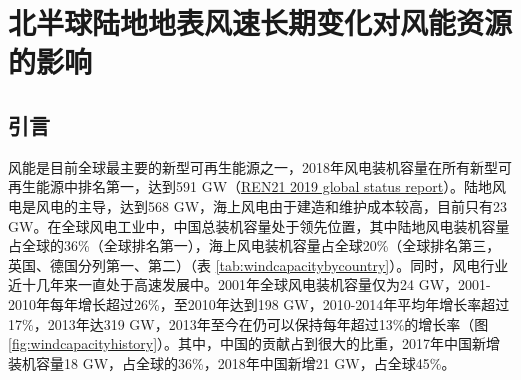 \chapter{北半球陆地地表风速长期变化对风能资源的影响}\label{chap:windenergychange}

\section{引言}

风能是目前全球最主要的新型可再生能源之一，2018年风电装机容量在所有新型可再生能源中排名第一，达到591 GW（\href{https://www.ren21.net/wp-content/uploads/2019/05/gsr_2019_full_report_en.pdf}{REN21 2019 global status report}）。陆地风电是风电的主导，达到568 GW，海上风电由于建造和维护成本较高，目前只有23 GW。在全球风电工业中，中国总装机容量处于领先位置，其中陆地风电装机容量占全球的36\%（全球排名第一），海上风电装机容量占全球20\%（全球排名第三，英国、德国分列第一、第二）（表 \ref{tab:windcapacitybycountry}）。同时，风电行业近十几年来一直处于高速发展中。2001年全球风电装机容量仅为24 GW，2001-2010年每年增长超过26\%，至2010年达到198 GW，2010-2014年平均年增长率超过17\%，2013年达319 GW，2013年至今在仍可以保持每年超过13\%的增长率（图 \ref{fig:windcapacityhistory}）。其中，中国的贡献占到很大的比重，2017年中国新增装机容量18 GW，占全球的36\%，2018年中国新增21 GW，占全球45\%。

